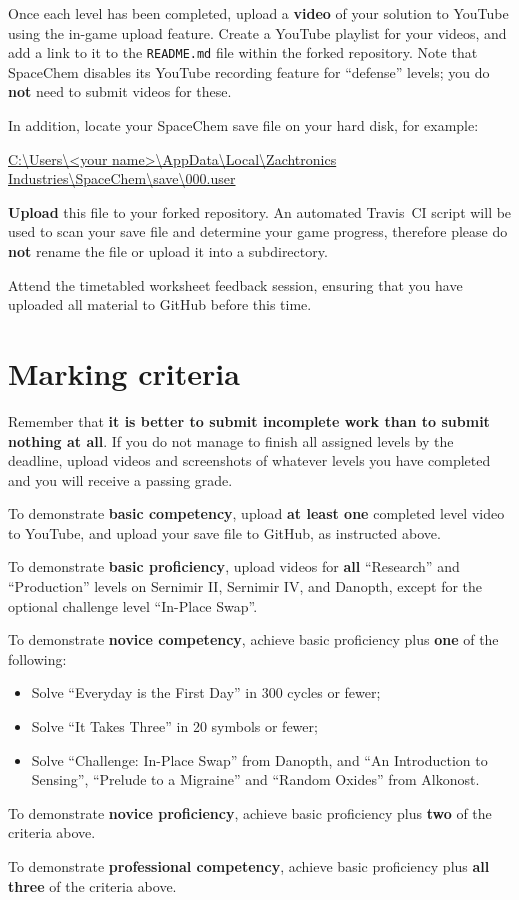 \documentclass{../../../fal_assignment}
\begin{document}
Once each level has been completed, upload a \textbf{video} of your solution to YouTube using the in-game upload feature.
Create a YouTube playlist for your videos, and add a link to it to the \texttt{README.md} file within the forked repository.
Note that SpaceChem disables its YouTube recording feature for ``defense'' levels; you do \textbf{not} need to submit videos for these.

In addition, locate your SpaceChem save file on your hard disk, for example:

\url{C:\Users\<your name>\AppData\Local\Zachtronics Industries\SpaceChem\save\000.user}

\textbf{Upload} this file to your forked repository.
An automated Travis~CI script will be used to scan your save file and determine your game progress,
therefore please do \textbf{not} rename the file or upload it into a subdirectory.

Attend the timetabled worksheet feedback session,
ensuring that you have uploaded all material to GitHub before this time.

\section*{Marking criteria}

Remember that \textbf{it is better to submit incomplete work than to submit nothing at all}. If you do not manage to finish all assigned levels by the deadline, upload videos and screenshots of whatever levels you have completed and you will receive a passing grade.

To demonstrate \textbf{basic competency}, upload \textbf{at least one} completed level video to YouTube, and upload your save file to GitHub, as instructed above.

To demonstrate \textbf{basic proficiency}, upload videos for \textbf{all} ``Research'' and ``Production'' levels on Sernimir II, Sernimir IV, and Danopth, except for the optional challenge level ``In-Place Swap''.

To demonstrate \textbf{novice competency}, achieve basic proficiency plus \textbf{one} of the following:
	\begin{itemize}
		\item Solve ``Everyday is the First Day'' in 300 cycles or fewer;
		\item Solve ``It Takes Three'' in 20 symbols or fewer;
		\item Solve ``Challenge: In-Place Swap'' from Danopth, and ``An Introduction to Sensing'', ``Prelude to a Migraine'' and ``Random Oxides'' from Alkonost.
	\end{itemize}

To demonstrate \textbf{novice proficiency}, achieve basic proficiency plus \textbf{two} of the criteria above.

To demonstrate \textbf{professional competency}, achieve basic proficiency plus \textbf{all three} of the criteria above.
\end{document}
